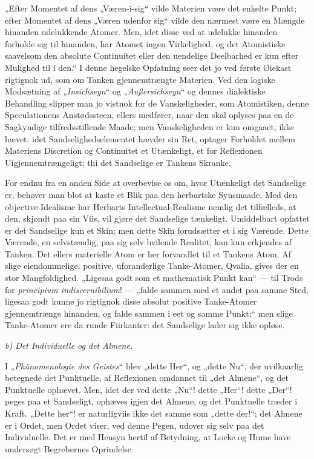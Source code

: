 \documentclass[12pt]{book}
\newcommand{\opage}[1]{\marginnote{\footnotesize\textit{[#1]}}}
\begin{document}
„Efter Momentet af dens „Væren-i-sig“ vilde Materien være det enkelte Punkt; efter
Momentet af dens „Væren udenfor sig“ vilde den nærmest være en Mængde hinanden
udelukkende Atomer. Men, idet disse ved at udelukke hinanden forholde sig til
hinanden, har Atomet ingen Virkelighed, og det Atomistiske saavelsom den absolute
Continuitet eller den uendelige Deelbarhed er kun efter Mulighed til i den.“ I denne
hegelske Opfatning seer det jo ved første Øiekast rigtignok ud, som om Tanken
gjennemtrængte Materien. Ved den logiske Modsætning af „\textit{Insichseyn}“ og
„\textit{Außersichseyn}“ og dennes dialektiske Behandling slipper man jo vistnok for
de Vanskeligheder, som Atomistiken, denne Speculationens Anstødssteen, ellers
medfører, naar den skal oplyses paa en de Sagkyndige tilfredsstillende Maade; men
Vanskeligheden er kun omgaaet, ikke hævet: idet Sandselighedselementet hævder sin Ret,
optager Forholdet mellem Materiens Discretion og Continuitet et Utænkeligt, et for
\opage{48} Reflexionen Uigjennemtrængeligt; thi det Sandselige er Tankens Skranke.

For endnu fra en anden Side at overbevise os om, hvor Utænkeligt det Sandselige er,
behøver man blot at kaste et Blik paa den herbartske Synsmaade. Med den objective
Idealisme har Herbarts Intellectual-Realisme nemlig det tilfælleds, at den, skjøndt
paa sin Viis, vil gjøre det Sandselige tænkeligt. Umiddelbart opfattet er det
Sandselige kun et Skin; men dette Skin forudsætter et i sig Værende. Dette Værende, en
selvstændig, paa sig selv hvilende Realitet, kan kun erkjendes af Tanken. Det ellers
materielle Atom er her forvandlet til et Tankens Atom. Af slige eiendommelige,
positive, uforanderlige Tanke-Atomer, Qvalia, gives der en stor Mangfoldighed.
„Ligesaa godt som et mathematisk Punkt kan“ — til Trods for \textit{principium
indiscernibilium}! — „falde sammen med et andet paa samme Sted, ligesaa godt kunne jo
rigtignok disse absolut positive Tanke-Atomer gjennemtrænge hinanden, og falde sammen
i eet og samme
Punkt;“ men slige Tanke-Atomer ere da runde Fiirkanter: det Sandselige lader sig ikke
opløse.

\emph{b) Det Individuelle og det Almene.}

I „\textit{Phänomenologie des Geistes}“ blev „dette Her“, og „dette Nu“, der
uvilkaarlig betegnede det Punktuelle, af Reflexionen omdannet til „det Almene“, og det
Punktuelle ophævet. Men, idet der ved dette „Nu“! dette „Her“! dette „Der“! peges paa
et Sandseligt, ophæves igjen det Almene, og det Punktuelle træder i Kraft. „Dette
her“! er naturligviis ikke det samme som „dette der!“; det Almene er i Ordet, men
Ordet viser, ved denne Pegen, udover sig selv paa det Individuelle. Det er med Hensyn
hertil af Betydning, at Locke og Hume have undersøgt Begrebernes Oprindelse.
\end{document}
